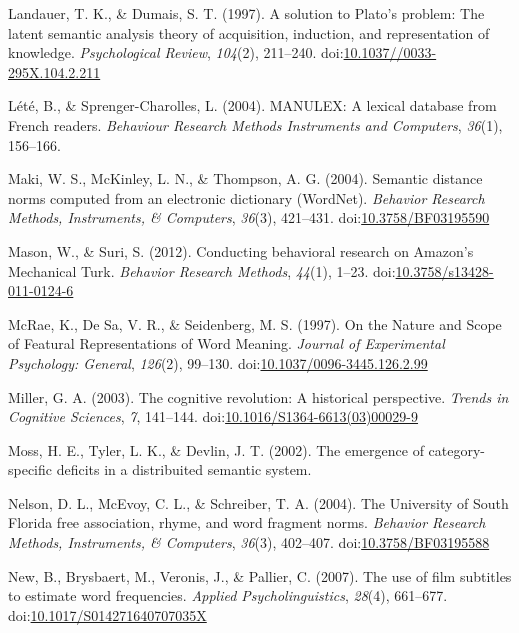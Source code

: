 \documentclass[english,man]{apa6}
\theoremstyle{definition}
\theoremstyle{definition}
\theoremstyle{definition}
\theoremstyle{remark}
\begin{document}
\hypertarget{ref-Landauer1997}{}
Landauer, T. K., \& Dumais, S. T. (1997). A solution to Plato's problem:
The latent semantic analysis theory of acquisition, induction, and
representation of knowledge. \emph{Psychological Review}, \emph{104}(2),
211--240.
doi:\href{https://doi.org/10.1037//0033-295X.104.2.211}{10.1037//0033-295X.104.2.211}

\hypertarget{ref-Lete2004}{}
Lété, B., \& Sprenger-Charolles, L. (2004). MANULEX: A lexical database
from French readers. \emph{Behaviour Research Methods Instruments and
Computers}, \emph{36}(1), 156--166.

\hypertarget{ref-Maki2004}{}
Maki, W. S., McKinley, L. N., \& Thompson, A. G. (2004). Semantic
distance norms computed from an electronic dictionary (WordNet).
\emph{Behavior Research Methods, Instruments, \& Computers},
\emph{36}(3), 421--431.
doi:\href{https://doi.org/10.3758/BF03195590}{10.3758/BF03195590}

\hypertarget{ref-Mason2012}{}
Mason, W., \& Suri, S. (2012). Conducting behavioral research on
Amazon's Mechanical Turk. \emph{Behavior Research Methods},
\emph{44}(1), 1--23.
doi:\href{https://doi.org/10.3758/s13428-011-0124-6}{10.3758/s13428-011-0124-6}

\hypertarget{ref-McRae1997}{}
McRae, K., De Sa, V. R., \& Seidenberg, M. S. (1997). On the Nature and
Scope of Featural Representations of Word Meaning. \emph{Journal of
Experimental Psychology: General}, \emph{126}(2), 99--130.
doi:\href{https://doi.org/10.1037/0096-3445.126.2.99}{10.1037/0096-3445.126.2.99}

\hypertarget{ref-Miller2003}{}
Miller, G. A. (2003). The cognitive revolution: A historical
perspective. \emph{Trends in Cognitive Sciences}, \emph{7}, 141--144.
doi:\href{https://doi.org/10.1016/S1364-6613(03)00029-9}{10.1016/S1364-6613(03)00029-9}

\hypertarget{ref-Moss2002}{}
Moss, H. E., Tyler, L. K., \& Devlin, J. T. (2002). The emergence of
category-specific deficits in a distribuited semantic system.

\hypertarget{ref-Nelson2004}{}
Nelson, D. L., McEvoy, C. L., \& Schreiber, T. A. (2004). The University
of South Florida free association, rhyme, and word fragment norms.
\emph{Behavior Research Methods, Instruments, \& Computers},
\emph{36}(3), 402--407.
doi:\href{https://doi.org/10.3758/BF03195588}{10.3758/BF03195588}

\hypertarget{ref-New2007}{}
New, B., Brysbaert, M., Veronis, J., \& Pallier, C. (2007). The use of
film subtitles to estimate word frequencies. \emph{Applied
Psycholinguistics}, \emph{28}(4), 661--677.
doi:\href{https://doi.org/10.1017/S014271640707035X}{10.1017/S014271640707035X}
\end{document}
